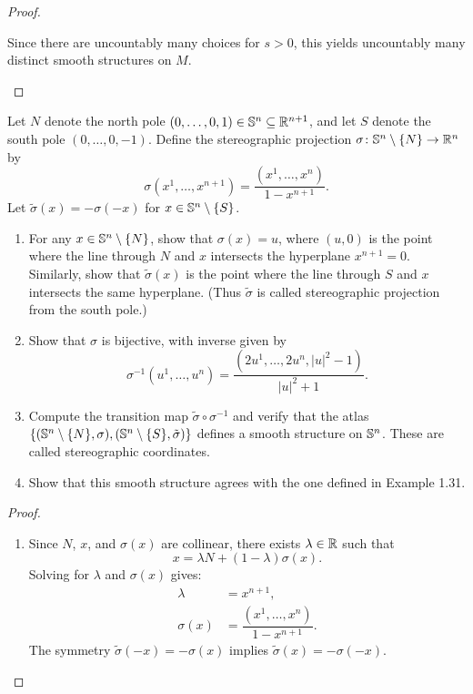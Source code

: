 \begin{problem}
\begin{proof}
\begin{enumerate}
      Since there are uncountably many choices for $s > 0$, this yields uncountably many distinct smooth structures on $M$.
    \end{enumerate}
  \end{proof}
\end{problem}

\begin{problem}
  Let $N$ denote the north pole $(0,\dots,0,1) \in \mathbb{S}^n \subseteq \mathbb{R}^{n+1}$, and let $S$ denote the south pole $(0,\dots,0,-1)$. Define the stereographic projection $\sigma\colon \mathbb{S}^n \setminus \{N\} \to \mathbb{R}^n$ by$$\sigma(x^1,\dots,x^{n+1}) = \frac{(x^1,\dots,x^n)}{1 - x^{n+1}}.$$ Let $\tilde{\sigma}(x) = - \sigma(-x)$ for $x \in \mathbb{S}^n \setminus \{S\}$.
  \begin{enumerate}
    \item For any $x \in \mathbb{S}^n \setminus \{N\}$, show that $\sigma(x) = u$, where $(u,0)$ is the point where the line through $N$ and $x$ intersects the hyperplane $x^{n+1} = 0$. Similarly, show that $\tilde{\sigma}(x)$ is the point where the line through $S$ and $x$ intersects the same hyperplane. (Thus $\tilde{\sigma}$ is called stereographic projection from the south pole.)
    \item Show that $\sigma$ is bijective, with inverse given by$$\sigma^{-1}(u^1,\dots,u^n) = \frac{(2u^1,\dots,2u^n, |u|^2 - 1)}{|u|^2 + 1}.$$
    \item Compute the transition map $\tilde{\sigma} \circ \sigma^{-1}$ and verify that the atlas $\{(\mathbb{S}^n \setminus \{N\}, \sigma), (\mathbb{S}^n \setminus \{S\}, \tilde{\sigma})\}$ defines a smooth structure on $\mathbb{S}^n$. These are called stereographic coordinates.
    \item Show that this smooth structure agrees with the one defined in Example 1.31.
  \end{enumerate}
  \begin{proof}
    \begin{enumerate}
      \item Since $N$, $x$, and $\sigma(x)$ are collinear, there exists $\lambda \in \mathbb{R}$ such that 
      \begin{equation*}
        x = \lambda N + (1-\lambda)\sigma(x).
      \end{equation*}
      Solving for $\lambda$ and $\sigma(x)$ gives:
      \begin{align*}
        \lambda      &= x^{n+1}, \\[0.5em]
        \sigma(x)    &= \dfrac{(x^1, \dots, x^n)}{1 - x^{n+1}}.
      \end{align*}
      The symmetry $\tilde{\sigma}(-x) = -\sigma(x)$ implies $\tilde{\sigma}(x) = -\sigma(-x)$.


\end{enumerate}
\end{proof}
\end{problem}
